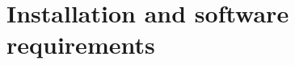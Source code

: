 \documentclass[]{article}
\begin{document}
%
%
%

\section{Installation and software requirements}
\label{install-and-reqs}








\end{document}
